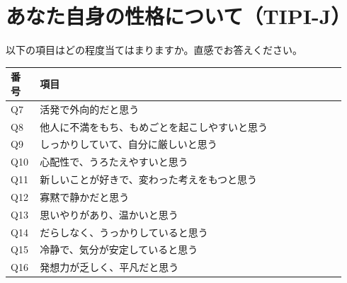 \section*{あなた自身の性格について（TIPI-J）}
\noindent 以下の項目はどの程度当てはまりますか。直感でお答えください。\\
\begin{longtable}{@{}p{0.08\linewidth}p{0.86\linewidth}@{}}
\toprule 番号 & 項目 \\ \midrule \endhead \bottomrule \endfoot
Q7 & 活発で外向的だと思う \\
Q8 & 他人に不満をもち、もめごとを起こしやすいと思う \\
Q9 & しっかりしていて、自分に厳しいと思う \\
Q10 & 心配性で、うろたえやすいと思う \\
Q11 & 新しいことが好きで、変わった考えをもつと思う \\
Q12 & 寡黙で静かだと思う \\
Q13 & 思いやりがあり、温かいと思う \\
Q14 & だらしなく、うっかりしていると思う \\
Q15 & 冷静で、気分が安定していると思う \\
Q16 & 発想力が乏しく、平凡だと思う \\
\end{longtable}
